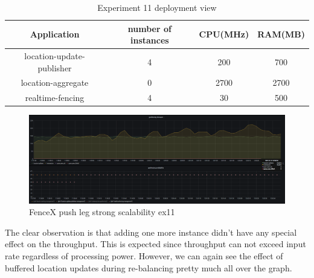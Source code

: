 \documentclass[a4]{report}
\begin{document}
    \begin{table}[h!]
        \centering
        \begin{tabular}{|c|c|c|c|}
            \hline
            Application               & number of instances & CPU(MHz) & RAM(MB) \\
            \hline
            location-update-publisher & 4                   & 200      & 700     \\
            location-aggregate        & 0                   & 2700     & 2700    \\
            realtime-fencing          & 4                   & 30       & 500     \\
            \hline
        \end{tabular}
        \caption{Experiment 11 deployment view}
        \label{table:ex11-dv}
    \end{table}

    \begin{figure}[h!]
        \caption{FenceX push leg strong scalability ex11}
        \label{fig:ex11}
        \includegraphics[scale=0.4]{images/evaluation/ex11-benchmarking-ongoing-2per4sec.png}
    \end{figure}
    The clear observation is that adding one more instance didn't have any special effect on the throughput.
    This is expected since throughput can not exceed input rate regardless of processing power.
    However, we can again see the effect of buffered location updates during re-balancing pretty much all over the
    graph.
\end{document}
